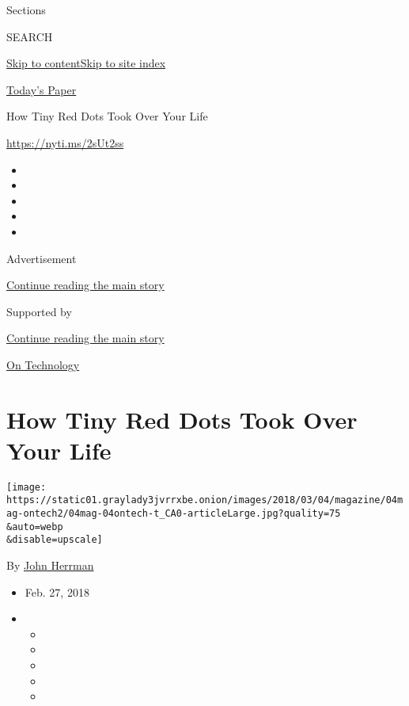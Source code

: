 Sections

SEARCH

\protect\hyperlink{site-content}{Skip to
content}\protect\hyperlink{site-index}{Skip to site index}

\href{https://myaccount.nytimes3xbfgragh.onion/auth/login?response_type=cookie\&client_id=vi}{}

\href{https://www.nytimes3xbfgragh.onion/section/todayspaper}{Today's
Paper}

How Tiny Red Dots Took Over Your Life

\url{https://nyti.ms/2sUt2ss}

\begin{itemize}
\item
\item
\item
\item
\item
\end{itemize}

Advertisement

\protect\hyperlink{after-top}{Continue reading the main story}

Supported by

\protect\hyperlink{after-sponsor}{Continue reading the main story}

\href{/column/on-technology}{On Technology}

\hypertarget{how-tiny-red-dots-took-over-your-life}{%
\section{How Tiny Red Dots Took Over Your
Life}\label{how-tiny-red-dots-took-over-your-life}}

\texttt{[image: https://static01.graylady3jvrrxbe.onion/images/2018/03/04/magazine/04mag-ontech2/04mag-04ontech-t\_CA0-articleLarge.jpg?quality=75\\\&auto=webp\\\&disable=upscale]}

By \href{https://www.nytimes3xbfgragh.onion/by/john-herrman}{John
Herrman}

\begin{itemize}
\item
  Feb. 27, 2018
\item
  \begin{itemize}
  \item
  \item
  \item
  \item
  \item
  \end{itemize}
\end{itemize}

